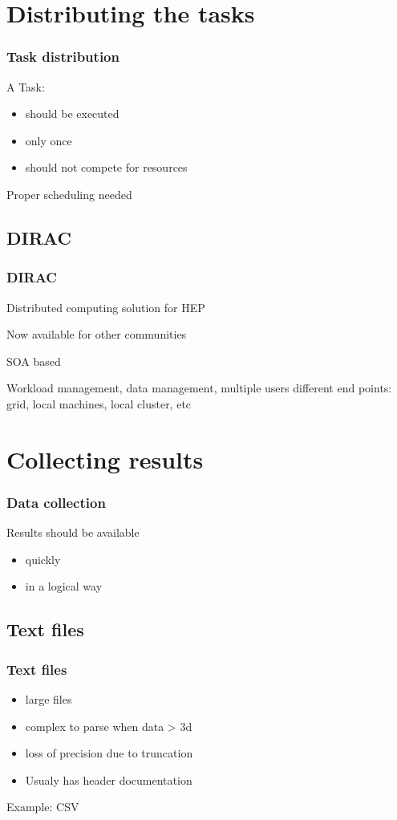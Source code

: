 \documentclass[14pt]{beamer}
\begin{document}
\section{Distributing the tasks}
\begin{frame}
\frametitle{Task distribution}
A Task:
\begin{itemize}
\item should be executed
\item only once
\item should not compete for resources
\end{itemize}
\alert{Proper scheduling needed}
\end{frame}

\subsection{DIRAC}
\begin{frame}
\frametitle{DIRAC}
Distributed computing solution for HEP

Now available for other communities

SOA based

Workload management, data management, multiple users
different end points: grid, local machines, local cluster, etc


\end{frame}

\section{Collecting results}
\begin{frame}
\frametitle{Data collection}
Results should be available
\begin{itemize}
\item quickly
\item in a logical way
\end{itemize}
\end{frame}

\subsection{Text files}
\begin{frame}
\frametitle{Text files}
\begin{itemize}
\item large files
\item complex to parse when data > 3d
\item loss of precision due to truncation
\item Usualy has header documentation 
\end{itemize}
Example: CSV
\end{frame}
\end{document}
